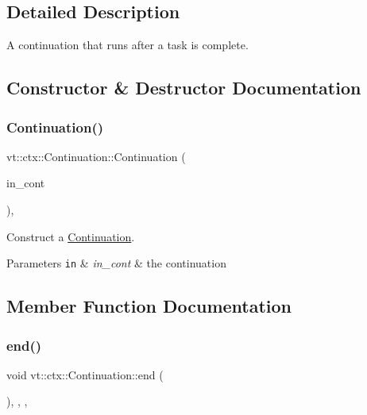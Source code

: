\subsection{Detailed Description}
A continuation that runs after a task is complete. 

\subsection{Constructor \& Destructor Documentation}
\mbox{\label{structvt_1_1ctx_1_1_continuation_ad18f8613f142fa3ed0e08f9d8df4e05a}} 
\subsubsection{\texorpdfstring{Continuation()}{Continuation()}}
{\footnotesize\ttfamily vt\+::ctx\+::\+Continuation\+::\+Continuation (\begin{DoxyParamCaption}\item[{\hyperlink{namespacevt_ae0a5a7b18cc99d7b732cb4d44f46b0f3}{Action\+Type}}]{in\+\_\+cont }\end{DoxyParamCaption})\hspace{0.3cm}{\ttfamily [inline]}, {\ttfamily [explicit]}}



Construct a {\ttfamily \hyperlink{structvt_1_1ctx_1_1_continuation}{Continuation}}. 


\begin{DoxyParams}[1]{Parameters}
\mbox{\tt in}  & {\em in\+\_\+cont} & the continuation \\
\hline
\end{DoxyParams}


\subsection{Member Function Documentation}
\mbox{\label{structvt_1_1ctx_1_1_continuation_aab0f231b54f257740a902a6b3258a33a}} 
\subsubsection{\texorpdfstring{end()}{end()}}
{\footnotesize\ttfamily void vt\+::ctx\+::\+Continuation\+::end (\begin{DoxyParamCaption}{ }\end{DoxyParamCaption})\hspace{0.3cm}{\ttfamily [inline]}, {\ttfamily [final]}, {\ttfamily [override]}, {\ttfamily [virtual]}}



